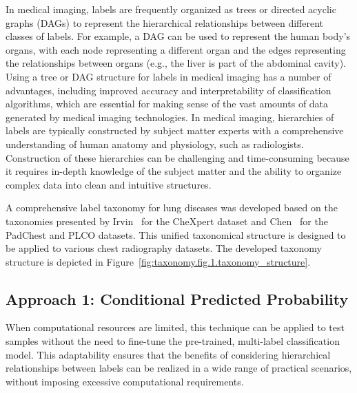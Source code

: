 In medical imaging, labels are frequently organized as trees or directed acyclic graphs (DAGs) to represent the hierarchical relationships between different classes of labels. For example, a DAG can be used to represent the human body's organs, with each node representing a different organ and the edges representing the relationships between organs (e.g., the liver is part of the abdominal cavity). Using a tree or DAG structure for labels in medical imaging has a number of advantages, including improved accuracy and interpretability of classification algorithms, which are essential for making sense of the vast amounts of data generated by medical imaging technologies. In medical imaging, hierarchies of labels are typically constructed by subject matter experts with a comprehensive understanding of human anatomy and physiology, such as radiologists. Construction of these hierarchies can be challenging and time-consuming because it requires in-depth knowledge of the subject matter and the ability to organize complex data into clean and intuitive structures.

A comprehensive label taxonomy for lung diseases was developed based on the taxonomies presented by Irvin~\cite{irvin_CheXpert_2019} for the CheXpert dataset and Chen~\cite{chen_Deep_2020} for the PadChest and PLCO datasets. This unified taxonomical structure is designed to be applied to various chest radiography datasets. The developed taxonomy structure is depicted in Figure~\ref{fig:taxonomy.fig.1.taxonomy_structure}.

\subsection{Approach 1: Conditional Predicted Probability}\label{subsec:taxonomy.method.approach1}
When computational resources are limited, this technique can be applied to test samples without the need to fine-tune the pre-trained, multi-label classification model. This adaptability ensures that the benefits of considering hierarchical relationships between labels can be realized in a wide range of practical scenarios, without imposing excessive computational requirements.

